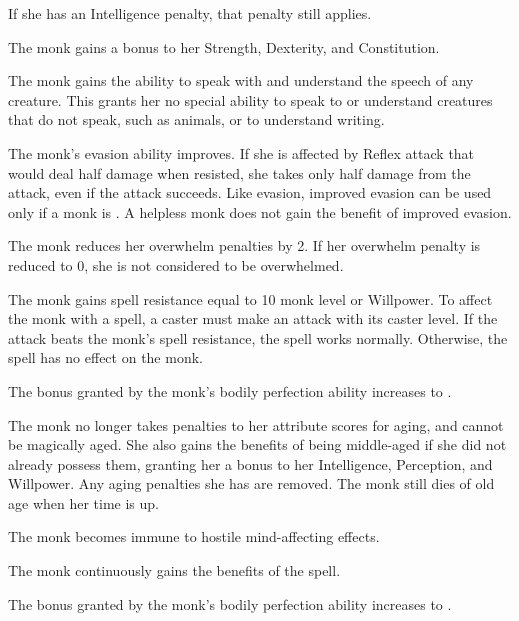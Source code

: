 If she has an Intelligence penalty, that penalty still applies.

The monk gains a  bonus to her Strength, Dexterity, and Constitution.

The monk gains the ability to speak with and understand the speech of any creature.
This grants her no special ability to speak to or understand creatures that do not speak, such as animals, or to understand writing.

The monk's evasion ability improves.
If she is affected by Reflex attack that would deal half damage when resisted, she takes only half damage from the attack, even if the attack succeeds.
Like evasion, improved evasion can be used only if a monk is \unencumbered.
A helpless monk does not gain the benefit of improved evasion.

 The monk reduces her overwhelm penalties by 2.
If her overwhelm penalty is reduced to 0, she is not considered to be overwhelmed.

The monk gains spell resistance equal to 10 \add monk level or Willpower.
To affect the monk with a spell, a caster must make an attack with its caster level.
If the attack beats the monk's spell resistance, the spell works normally.
Otherwise, the spell has no effect on the monk.

The bonus granted by the monk's bodily perfection ability increases to .

The monk no longer takes penalties to her attribute scores for aging, and cannot be magically aged.
She also gains the benefits of being middle-aged if she did not already possess them, granting her a  bonus to her Intelligence, Perception, and Willpower.
Any aging penalties she has are removed.
The monk still dies of old age when her time is up.

The monk becomes immune to hostile mind-affecting effects.

 The monk continuously gains the benefits of the 
spell.

The bonus granted by the monk's bodily perfection ability increases to .


